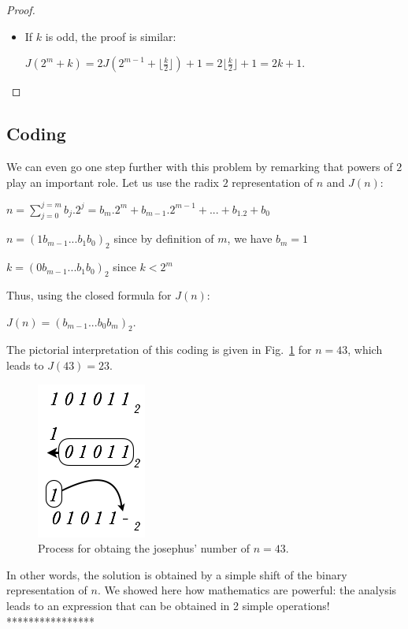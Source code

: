 {{\begin{proof}
\begin{itemize}
\begin{itemize}
$J(2^m+k) = 2J(2^{m-1}+\frac{k}{2})-1$

by induction hypothesis, $J(2^{m-1} +\frac{k}{2}) = 2\frac{k}{2} +1 = k+1$

Thus, $J(2^m+k) = 2(k+1) -1 = 2k+1$.

\item If $k$ is odd, the proof is similar:

$J(2^m+k) = 2J(2^{m-1}+\lfloor \frac{k}{2} \rfloor)+1 = 2\lfloor \frac{k}{2} \rfloor +1 = 2k+1$.

\end{itemize}
\end{itemize}
\end{proof}
}
\subsection{Coding}

We can even go one step further with this problem by remarking that powers of $2$ play an important role.
Let us use the radix $2$ representation of $n$ and $J(n)$:

$n = \sum_{j=0}^{j=m} b_j.2^j = b_m.2^m + b_{m-1}.2^{m-1} + ... + b_1.2 + b_0$

$n = (1 b_{m-1} ... b_1 b_0)_2$ since by definition of $m$, we have $b_m=1$ 

$k = (0 b_{m-1} ... b_1 b_0)_2$ since $k < 2^m$

Thus, using the closed formula for $J(n)$:

$J(n) = (b_{m-1} ... b_0 b_m)_2$.

The pictorial interpretation of this coding is given in Fig.~\ref{fig:josephusCoding} for $n=43$, which leads to $J(43) = 23$.
\begin{figure}[h]
\begin{center}
        \includegraphics[scale=0.4]{FiguresMaths/josephusCoding}
        \caption{Process for obtaing the josephus' number of $n=43$.}
        \label{fig:josephusCoding}
\end{center}
\end{figure}

In other words, the solution is obtained by a simple shift of the binary representation of $n$.
We showed here how mathematics are powerful: the analysis leads to an expression that can be obtained in 2 simple operations!
****************}


